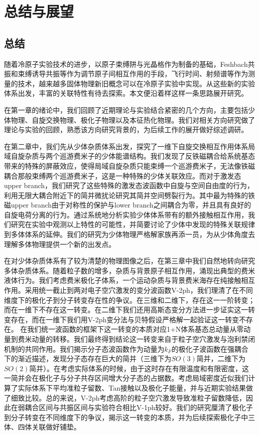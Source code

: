 \chapter{总结与展望}\label{chap:summaryandoutlook}

\section{总结}
随着冷原子实验技术的进步，以原子束缚阱与光晶格作为制备的基础，Feshbach共振和束缚诱导共振等作为调节原子间相互作用的手段，飞行时间、射频谱等作为测量的技术，越来越多固体物理新旧概念可以在冷原子实验中实现。从这些新的实验体系出发，丰富的关联特性有待去探索。本文便沿着样这样一条思路展开研究。

在第一章的绪论中，我们回顾了近期理论与实验结合紧密的几个方向，主要包括少体物理、自旋交换物理、极化子物理以及本征热化物理。我们对相关方向研究做了理论与实验的回顾，熟悉该方向研究背景的，为后续工作的展开做好综述调研。

在第二章中，我们先从少体杂质体系出发，探究了一维下自旋交换相互作用体系局域自旋杂质与两个巡游费米子的少体能谱结构。我们发现了反铁磁耦合给系统基态带来的特殊的屏蔽效应，使得局域自旋杂质只能束缚一个巡游费米子，无法像铁磁耦合那般束缚两个巡游费米子，这是一种特殊的少体关联效应。而对于激发态upper branch，我们研究了这些特殊的激发态波函数中自旋与空间自由度的行为，利用无限大耦合附近下的简并微扰论研究其简并空间劈裂行为。其中最为特殊的铁磁upper branch由于对称性的保护与lower branch之间耦合为零，并且具有良好的自旋电荷分离的行为。通过系统地分析实验少体体系带有的额外接触相互作用，我们研究在实验中观测以上特性的可能性，并简要讨论了少体中发现的特殊关联规律到多体体系的延伸。我们的研究为少体物理严格解家族再添一员，为从少体角度去理解多体物理提供一个新的出发点。

在对少体杂质体系有了较为清楚的物理图像之后，在第三章中我们自然地转向研究多体杂质体系。随着粒子数的增多，杂质与背景原子相互作用，涌现出典型的费米液体行为。我们考虑费米极化子体系，一个运动杂质与背景费米海存在纯接触相互作用。采用统一截止到两对电子空穴激发的变分波函数V-2ph，我们理清了在不同维度下的极化子到分子转变存在性的争议。在三维和二维下，存在这一一阶转变；而在一维下不存在这一转变。在二维下我们还用高斯态变分方法进一步证实这一转变存在，而在一维下我们用V-2ph变分法与贝特假设严格解一起验证这一转变不存在。 在我们统一波函数的框架下这一转变的本质对应1+N体系基态总动量从零动量到费米动量的转移。我们最终得到结论这一转变来自于粒子空穴激发与泡利禁闭机制的共同作用。我们揭示分子态波函数作为动量为$k_F$的极化子波函数在强耦合下的渐近描述，发现分子态存在巨大的简并（三维下为$SO(3)$简并，二维下为$SO(2)简并$）。在考虑实际体系的时候，由于这时存在有限温度和有限密度，这一简并会在极化子与分子共存区间增大分子态的占据数。考虑局域密度近似我们计算了实际体系下平均准粒子留数、Tan接触以及极化子能量，并与近期实验结果做了细致比较。总的来说，V-2ph考虑高阶的粒子空穴激发导致准粒子留数降低，因此在弱耦合区间与共振区间与实验符合相比V-1ph较好。我们的研究厘清了极化子到分子转变在不同维度下的争议，揭示这一转变的本质，并为后续探索极化子中三体、四体关联做好铺垫。


